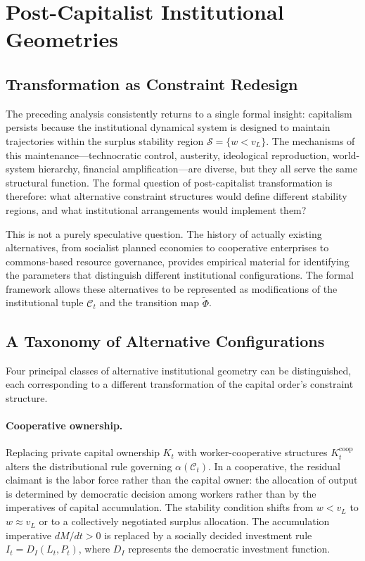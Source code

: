 \documentclass[12pt,a4paper]{article}
\theoremstyle{definition}
\theoremstyle{remark}
\begin{document}
\section{Post-Capitalist Institutional Geometries}
\label{sec:postcapitalist}

\subsection{Transformation as Constraint Redesign}

The preceding analysis consistently returns to a single formal insight: capitalism persists because the institutional dynamical system is designed to maintain trajectories within the surplus stability region $\mathcal{S} = \{w < v_L\}$. The mechanisms of this maintenance---technocratic control, austerity, ideological reproduction, world-system hierarchy, financial amplification---are diverse, but they all serve the same structural function. The formal question of post-capitalist transformation is therefore: what alternative constraint structures would define different stability regions, and what institutional arrangements would implement them?

This is not a purely speculative question. The history of actually existing alternatives, from socialist planned economies to cooperative enterprises to commons-based resource governance, provides empirical material for identifying the parameters that distinguish different institutional configurations. The formal framework allows these alternatives to be represented as modifications of the institutional tuple $\mathcal{C}_t$ and the transition map $\tilde\Phi$.

\subsection{A Taxonomy of Alternative Configurations}

Four principal classes of alternative institutional geometry can be distinguished, each corresponding to a different transformation of the capital order's constraint structure.

\paragraph{Cooperative ownership.} Replacing private capital ownership $K_t$ with worker-cooperative structures $K_t^{\text{coop}}$ alters the distributional rule governing $\alpha(\mathcal{C}_t)$. In a cooperative, the residual claimant is the labor force rather than the capital owner: the allocation of output is determined by democratic decision among workers rather than by the imperatives of capital accumulation. The stability condition shifts from $w < v_L$ to $w \approx v_L$ or to a collectively negotiated surplus allocation. The accumulation imperative $dM/dt > 0$ is replaced by a socially decided investment rule $I_t = D_I(L_t, P_t)$, where $D_I$ represents the democratic investment function.
\end{document}
